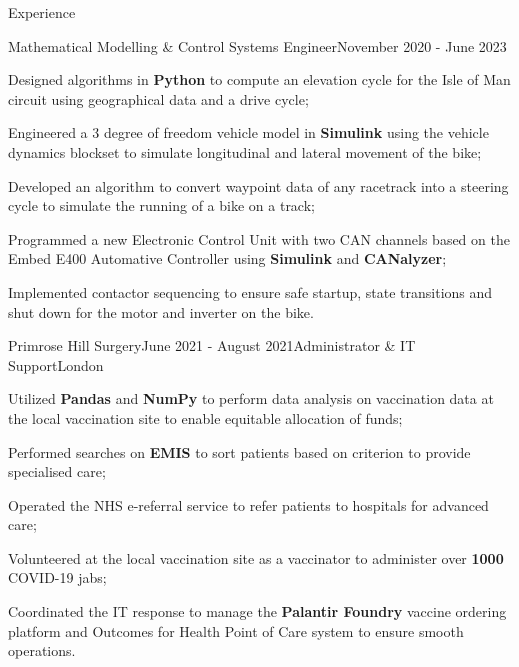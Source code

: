 \documentclass{resume}
\begin{document}
\begin{rSection}{Experience}
        \vspace{-0.4cm}

        \begin{rSubsection}{}{}{Mathematical Modelling \& Control Systems Engineer}{November 2020 - June 2023}{}
            \item Designed algorithms in \textbf{Python} to compute an elevation cycle for the Isle of Man circuit using geographical data and a drive cycle;
            \item Engineered a 3 degree of freedom vehicle model in \textbf{Simulink} using the vehicle dynamics blockset to simulate longitudinal and lateral movement of the bike;
            \item Developed an algorithm to convert waypoint data of any racetrack into a steering cycle to simulate the running of a bike on a track;
            \item Programmed a new Electronic Control Unit with two CAN channels based on the Embed E400 Automative Controller using \textbf{Simulink} and \textbf{CANalyzer};
            \item Implemented contactor sequencing to ensure safe startup, state transitions and shut down for the motor and inverter on the bike.       
        \end{rSubsection}


        \begin{rSubsection}{Primrose Hill Surgery}{June 2021 - August 2021}{Administrator \& IT Support}{London}{}
            \item Utilized \textbf{Pandas} and \textbf{NumPy} to perform data analysis on vaccination data at the local vaccination site to enable equitable allocation of funds;
            \item Performed searches on \textbf{EMIS} to sort patients based on criterion to provide specialised care;
            \item Operated the NHS e-referral service to refer patients to hospitals for advanced care;
            \item Volunteered at the local vaccination site as a vaccinator to administer over \textbf{1000} COVID-19 jabs;
            \item Coordinated the IT response to manage the \textbf{Palantir Foundry} vaccine ordering platform and Outcomes for Health Point of Care system to ensure smooth operations.
        \end{rSubsection}
    \end{rSection}
\end{document}
